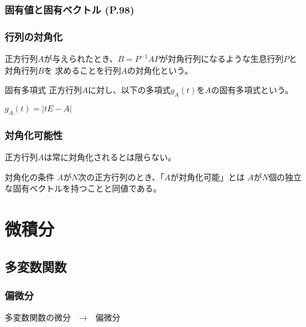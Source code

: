 \documentclass[a4paper]{jsarticle}
\begin{document}
\subsubsection{固有値と固有ベクトル (P.98)}
\subsubsection{行列の対角化}
正方行列$A$が与えられたとき、$B=P^{-1}AP$が対角行列になるような生息行列$P$と対角行列$B$を
求めることを行列$A$の対角化という。
\begin{itembox}[l]{固有多項式}
    正方行列$A$に対し、以下の多項式$g_A\left(t\right)$を$A$の固有多項式という。
    \begin{center}
        $g_A\left(t\right) = \left|tE-A\right| $
    \end{center}
\end{itembox}
\subsubsection{対角化可能性}
正方行列$A$は常に対角化されるとは限らない。
\begin{itembox}[l]{対角化の条件}
    $A$が$N$次の正方行列のとき、「$A$が対角化可能」とは
    $A$が$N$個の独立な固有ベクトルを持つことと同値である。
\end{itembox}
\section{微積分}
\subsection{多変数関数}
\subsubsection{偏微分}
多変数関数の微分　→　偏微分
\end{document}
